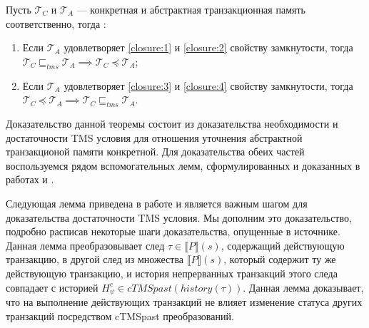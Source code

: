 \begin{theorem}\label{theorem1} Пусть $\mathcal{T}_C$ и $\mathcal{T}_A$ --- конкретная и абстрактная транзакционная память соответственно, тогда :
\begin{enumerate}
\item Если $\mathcal{T}_A$ удовлетворяет \ref{closure:1} и \ref{closure:2} свойству замкнутости, тогда $\mathcal{T}_C \sqsubseteq_{tms} \mathcal{T}_A \implies \mathcal{T}_C \preceq \mathcal{T}_A$;
\item Если $\mathcal{T}_A$ удовлетворяет \ref{closure:3} и \ref{closure:4} свойству замкнутости, тогда $\mathcal{T}_C \preceq \mathcal{T}_A \implies \mathcal{T}_C \sqsubseteq_{tms} \mathcal{T}_A $.
\end{enumerate}
\end{theorem}

Доказательство данной теоремы состоит из доказательства необходимости и достаточности TMS условия для отношения уточнения абстрактной транзакционой памяти конкретной. Для доказательства обеих частей воспользуемся рядом вспомогательных лемм, сформулированных и доказанных в работах \cite{tms_article} и \cite{opacity_article}.

Следующая лемма приведена в работе \cite{tms_article} и является важным шагом для доказательства достаточности TMS условия. Мы дополним это доказательство, подробно расписав некоторые шаги доказательства, опущенные в источнике. Данная лемма преобразовывает след $\tau \in \llbracket P \rrbracket(s)$, содержащий действующую транзакцию, в другой след из множества $\llbracket P \rrbracket(s)$, который содержит ту же действующую транзакцию, и история непрерванных транзакций этого следа совпадает с историей $H^c_{\psi} \in cTMSpast(history(\tau))$. Данная лемма доказывает, что на выполнение действующих транзакций не влияет изменение статуса других транзакций посредством cTMSpast преобразований.

